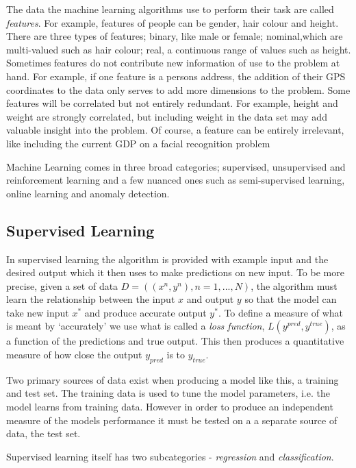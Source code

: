 The data the machine learning algorithms use to perform their task are called \textit{features}.
For example, features of people can be gender, hair colour and height.
There are three types of features; binary, like male or female; nominal,which are multi-valued such as hair colour; real, a continuous range of values such as height.
Sometimes features do not contribute new information of use to the problem at hand.
For example, if one feature is a persons address, the addition of their GPS coordinates to the data only serves to add more dimensions to the problem.
Some features will be correlated but not entirely redundant.
For example, height and weight are strongly correlated, but including weight in the data set may add valuable insight into the problem.
Of course, a feature can be entirely irrelevant, like including the current GDP on a facial recognition problem


Machine Learning comes in three broad categories; supervised, unsupervised and reinforcement learning \citep{barber2012bayesian} and a few nuanced ones such as semi-supervised learning, online learning and anomaly detection.


	\subsection{Supervised Learning}


In supervised learning the algorithm is provided with example input and the desired output which it then uses to make predictions on new input. 
To be more precise, given a set of data $D = ((x^n,y^n), n =1, ..., N )$, the algorithm must learn the relationship between the input $x$ and output $y$ so that the model can take new input $x^*$ and produce accurate output $y^*$. 
To define a measure of what is meant by `accurately' we use what is called a \textit{loss function}, $L(y^{pred},y^{true})$, as a function of the predictions and true output.
This then produces a quantitative measure of how close the output $y_{pred}$ is to $y_{true}$.

Two primary sources of data exist when producing a model like this, a training and test set.
The training data is used to tune the model parameters, i.e. the model learns from training data.
However in order to produce an independent measure of the models performance it must be tested on a a separate source of data, the test set. 

Supervised learning itself has two subcategories - \textit{regression} and \textit{classification}.
		
